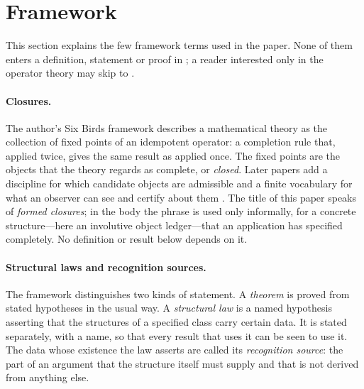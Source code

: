 \section{Framework}
\label{sec:framework}

This section explains the few framework terms used in the paper.
None of them enters a definition, statement or proof in
;
a reader interested only in the operator theory may skip to
.

\paragraph{Closures.}
The author's Six Birds framework \citep{TsiokosFoundationsI2026}
describes a mathematical theory as the collection of fixed points of an
idempotent operator: a completion rule that, applied twice, gives the
same result as applied once.  The fixed points are the objects that the
theory regards as complete, or \emph{closed}.  Later papers add a
discipline for which candidate objects are admissible
\citep{TsiokosFoundationsII2026} and a finite vocabulary for what an
observer can see and certify about them
\citep{TsiokosFoundationsIII2026}.  The title of this paper speaks of
\emph{formed closures}; in the body the phrase is used only informally,
for a concrete structure---here an involutive object ledger---that an
application has specified completely.  No definition or result below
depends on it.

\paragraph{Structural laws and recognition sources.}
The framework distinguishes two kinds of statement.  A \emph{theorem}
is proved from stated hypotheses in the usual way.  A \emph{structural
law} is a named hypothesis asserting that the structures of a
specified class carry certain data.  It is stated separately, with a
name, so that every result that uses it can be seen to use it.  The
data whose existence the law asserts are called its \emph{recognition
source}: the part of an argument that the structure itself must
supply and that is not derived from anything else.

